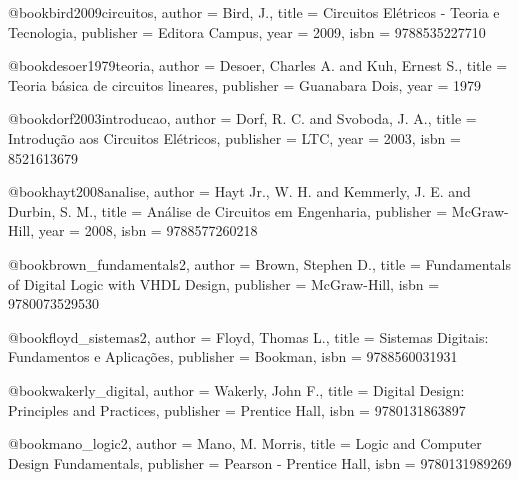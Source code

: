 @book{bird2009circuitos,
  author = {Bird, J.},
  title = {Circuitos Elétricos - Teoria e Tecnologia},
  publisher = {Editora Campus},
  year = {2009},
  isbn = {9788535227710}
}

@book{desoer1979teoria,
  author = {Desoer, Charles A. and Kuh, Ernest S.},
  title = {Teoria básica de circuitos lineares},
  publisher = {Guanabara Dois},
  year = {1979}
}

@book{dorf2003introducao,
  author = {Dorf, R. C. and Svoboda, J. A.},
  title = {Introdução aos Circuitos Elétricos},
  publisher = {LTC},
  year = {2003},
  isbn = {8521613679}
}

@book{hayt2008analise,
  author = {Hayt Jr., W. H. and Kemmerly, J. E. and Durbin, S. M.},
  title = {Análise de Circuitos em Engenharia},
  publisher = {McGraw-Hill},
  year = {2008},
  isbn = {9788577260218}
}

%

@book{brown_fundamentals2,
  author = {Brown, Stephen D.},
  title = {Fundamentals of Digital Logic with VHDL Design},
  publisher = {McGraw-Hill},
  isbn = {9780073529530}
}

@book{floyd_sistemas2,
  author = {Floyd, Thomas L.},
  title = {Sistemas Digitais: Fundamentos e Aplicações},
  publisher = {Bookman},
  isbn = {9788560031931}
}

@book{wakerly_digital,
  author = {Wakerly, John F.},
  title = {Digital Design: Principles and Practices},
  publisher = {Prentice Hall},
  isbn = {9780131863897}
}

@book{mano_logic2,
  author = {Mano, M. Morris},
  title = {Logic and Computer Design Fundamentals},
  publisher = {Pearson - Prentice Hall},
  isbn = {9780131989269}
}

